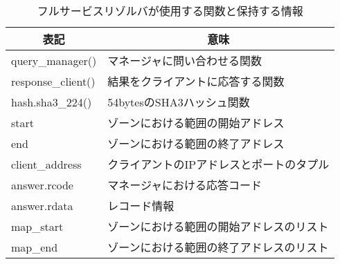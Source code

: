 \begin{table}[htbp]
 \caption{フルサービスリゾルバが使用する関数と保持する情報}
 \centering
  \begin{tabular}{ll}
    \toprule
		\multicolumn{1}{c}{\textbf{表記}} & \multicolumn{1}{c}{\textbf{意味}} \\
    \midrule
		query\_manager() & マネージャに問い合わせる関数 \\
		response\_client() & 結果をクライアントに応答する関数 \\
		hash.sha3\_224() & 54bytesのSHA3ハッシュ関数 \\
    start & ゾーンにおける範囲の開始アドレス \\
    end & ゾーンにおける範囲の終了アドレス \\
    client\_address & クライアントのIPアドレスとポートのタプル \\
		answer.rcode & マネージャにおける応答コード \\
		answer.rdata & レコード情報 \\
    map\_start & ゾーンにおける範囲の開始アドレスのリスト \\
    map\_end & ゾーンにおける範囲の終了アドレスのリスト \\
    \bottomrule
  \end{tabular}
 \label{tab:discription-fullresolv}
\end{table}
